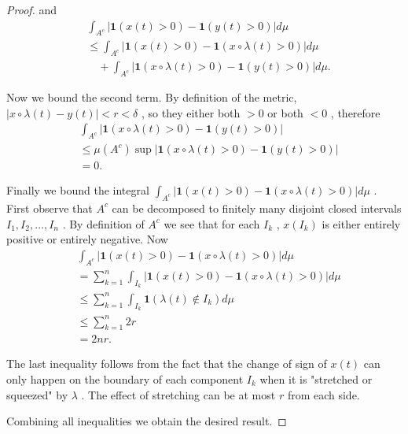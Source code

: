 \begin{proof}
		and  
		  \begin{align*}
		  &\int_{A^c} \left| \mathbf{1}\left( x(t) > 0 \right)  - \mathbf{1}\left( y(t) > 0 \right)  \right| d\mu \\
		  	&\le \int _{A^c} \left| \mathbf{1}\left( x(t) >0 \right) -\mathbf{1}\left( x \circ \lambda(t) > 0 \right)  \right| d \mu\\
		  	& \quad + \int _{A^c} \left| \mathbf{1}\left( x \circ \lambda(t) > 0 \right) - \mathbf{1}\left( y(t) >0 \right) \right| d \mu
		  .
		  \end{align*}
		    
		Now we bound the second term. By definition of the metric, $\left| x\circ \lambda(t) - y(t) \right| < r < \delta$ , so they either both $>0$ or both $<0$ , therefore  
		  \begin{align*}
		  &\int _{A^c} \left| \mathbf{1}\left( x \circ \lambda(t) > 0 \right) - \mathbf{1}\left( y(t) >0 \right) \right| \\
		  	&\le \mu(A^c) \operatorname{sup}  \left| \mathbf{1}\left( x \circ \lambda(t) > 0 \right) - \mathbf{1}\left( y(t) >0 \right) \right|\\
		  	&= 0 
		  .
		  \end{align*}
		    
		Finally we bound the integral $\displaystyle \int_{A^c}|\mathbf{1}(x(t)>0)-\mathbf{1}(x \circ \lambda(t)>0)| d \mu$ .  
		First observe that $A^c$ can be decomposed to finitely many disjoint closed intervals $I_1, I_2, \ldots, I_n$ . By definition of $A^c$ we see that for each $I_k$ , $x(I_k)$ is either entirely positive or entirely negative.  
		Now  
		  \begin{align*}
		  & \int _{A^c} \left| \mathbf{1}\left( x(t) >0 \right) -\mathbf{1}\left( x \circ \lambda(t) > 0 \right)  \right| d \mu\\
		  	&= \sum_{k=1}^{n} \int _{I_k}   \left| \mathbf{1}\left( x(t) >0 \right) -\mathbf{1}\left( x \circ \lambda(t) > 0 \right)  \right| d \mu\\
		  	&\le  \sum_{k=1}^{n} \int _{I_k}   \mathbf{1}\left( \lambda(t) \not\in I_k \right)  d \mu\\
		  	&\le \sum_{k=1}^{n} 2 r \\
		  	&= 2 n r
		  .
		  \end{align*}
		    
		The last inequality follows from the fact that the change of sign of $x(t)$ can only happen on the boundary of each component $I_k$ when it is "stretched or squeezed" by $\lambda$ . The effect of stretching can be at most $r$ from each side.  

		Combining all inequalities we obtain the desired result.   
\end{proof}

